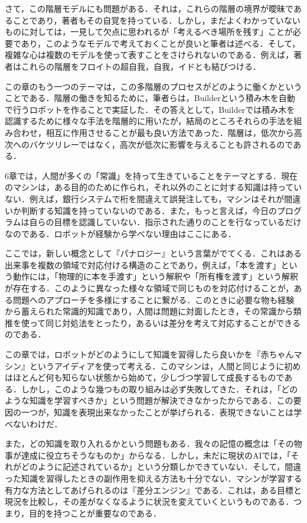\documentclass{jarticle}
\begin{document}
さて，この階層モデルにも問題がある．それは，これらの階層の境界が曖昧であることであり，著者もその自覚を持っている．しかし，まだよくわかっていないものに対しては，一見して欠点に思われるが「考えるべき場所を残す」ことが必要であり，このようなモデルで考えておくことが良いと筆者は述べる．そして，複雑な心は複数のモデルを使って表すことをさけられないのである．例えば，著者はこれらの階層をフロイトの超自我，自我，イドとも結びつける．

この章のもう一つのテーマは，この多階層のプロセスがどのように働くかということである．階層の働きを知るために，筆者らは，Builderという積み木を自動で行うロボットを作ることで実証した．その答えとして，Builderでは積み木を認識するために様々な手法を階層的に用いたが，結局のところそれらの手法を組み合わせ，相互に作用させることが最も良い方法であった．階層は，低次から高次へのバケツリレーではなく，高次が低次に影響を与えることも許されるのである．





6章では，人間が多くの「常識」を持って生きていることをテーマとする．現在のマシンは，ある目的のために作られ，それ以外のことに対する知識は持っていない．例えば，銀行システムで桁を間違えて誤発注しても，マシンはそれが間違いか判断する知識を持っていないのである．また，もっと言えば，今日のプログラムは自らの目標を認識していない．指示された通りのことを行なっているだけなのである．ロボットが経験から学べない理由はここにある．

ここでは，新しい概念として『パナロジー』という言葉がでてくる．これはある出来事を複数の領域で対応付ける構造のことであり，例えば，「本を渡す」という動作には，「物理的に本を手渡す」という解釈や「所有権を渡す」という解釈が存在する．このように異なった様々な領域で同じものを対応付けることが，ある問題へのアプローチを多様にすることに繋がる．このときに必要な物も経験から蓄えられた常識的知識であり，人間は問題に対面したとき，その常識から類推を使って同じ対処法をとったり，あるいは差分を考えて対応することができるのである．

この章では，ロボットがどのようにして知識を習得したら良いかを『赤ちゃんマシン』というアイディアを使って考える．このマシンは，人間と同じように初めはほとんど何も知らない状態から始めて，少しづつ学習して成長するものである．しかし，このような幾つもの取り組みは必ず失敗してきた．それは，「どのような知識を学習すべきか」という問題が解決できなかったからである．この要因の一つが，知識を表現出来なかったことが挙げられる．表現できないことは学べないわけだ．

また，どの知識を取り入れるかという問題もある．我々の記憶の概念は「その物事が達成に役立ちそうなものか」からなる．しかし，未だに現状のAIでは，「それがどのように記述されているか」という分類しかできていない．そして，間違った知識を習得したときの副作用を抑える方法も十分でない．マシンが学習する有力な方法としてあげられるのは『差分エンジン』である．これは，ある目標と現況を比較し，その差がなくなるように状況を変えていくというものである．つまり，目的を持つことが重要なのである．
\end{document}
